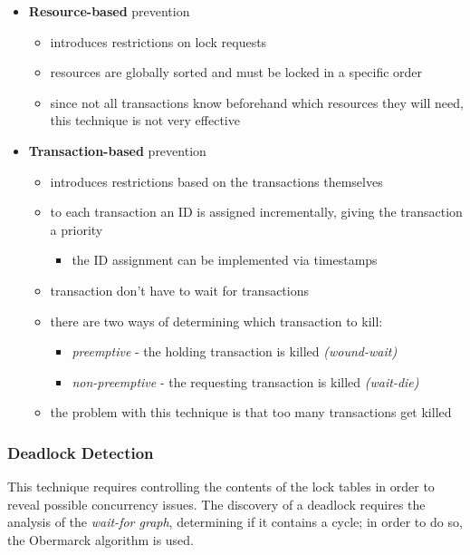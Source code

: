 \documentclass[english]{article}
\begin{document}
\begin{itemize}
  \item \textbf{Resource-based} prevention
        \begin{itemize}
          \item introduces restrictions on lock requests
          \item resources are globally sorted and must be locked in a specific order
          \item since not all transactions know beforehand which resources they will need, this technique is not very effective
        \end{itemize}
  \item \textbf{Transaction-based} prevention
        \begin{itemize}
          \item introduces restrictions based on the transactions themselves
          \item to each transaction an ID is assigned incrementally, giving the transaction a priority
                \begin{itemize}
                  \item the ID assignment can be implemented via timestamps
                \end{itemize}
          \item {} transaction don't have to wait for  transactions
          \item there are two ways of determining which transaction to kill:
                \begin{itemize}
                  \item \textit{preemptive} - the holding transaction is killed \textit{(wound-wait)}
                  \item \textit{non-preemptive} - the requesting transaction is killed \textit{(wait-die)}
                \end{itemize}
          \item the problem with this technique is that too many transactions get killed
        \end{itemize}
\end{itemize}

\subsubsection{Deadlock Detection}

This technique requires controlling the contents of the lock tables in order to reveal possible concurrency issues.
The discovery of a deadlock requires the analysis of the \textit{wait-for graph}, determining if it contains a cycle;
in order to do so, the Obermarck algorithm is used.
\end{document}

